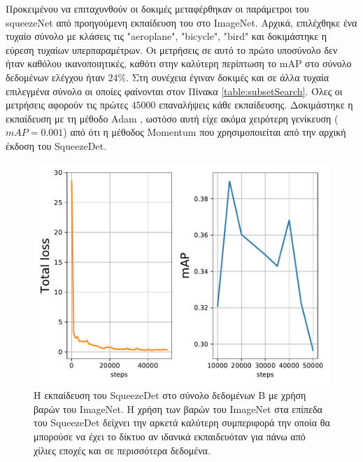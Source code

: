Προκειμένου να επιταχυνθούν οι δοκιμές μεταφέρθηκαν οι παράμετροι του squeezeNet από προηγούμενη εκπαίδευση του στο ImageNet. Αρχικά, επιλέχθηκε ένα τυχαίο σύνολο με κλάσεις τις "aeroplane", "bicycle", "bird" και δοκιμάστηκε η εύρεση τυχαίων υπερπαραμέτρων. Οι μετρήσεις σε αυτό το πρώτο υποσύνολο δεν ήταν καθόλου ικανοποιητικές, καθότι στην καλύτερη περίπτωση το mAP στο σύνολο δεδομένων ελέγχου ήταν $24\%$. Στη συνέχεια έγιναν δοκιμές και σε άλλα τυχαία επιλεγμένα σύνολο οι οποίες φαίνονται στον Πίνακα \ref{table:subsetSearch}. Όλες οι μετρήσεις αφορούν τις πρώτες $45000$ επαναλήψεις κάθε εκπαίδευσης. Δοκιμάστηκε η εκπαίδευση με τη μέθοδο Adam \cite{19}, ωστόσο αυτή είχε ακόμα χειρότερη γενίκευση ($mAP=0.001$) από ότι η μέθοδος Momentum \cite{81} που χρησιμοποιείται από την αρχική έκδοση του SqueezeDet.

\begin{figure}
\centering
\includegraphics[width = \textwidth]{figures/experiments/Btrain1.pdf}
\caption[Η εκπαίδευση του SqueezeDet στο σύνολο δεδομένων B, με χρήση βαρών του ImageNet]{Η εκπαίδευση του SqueezeDet στο σύνολο δεδομένων B με χρήση βαρών του ImageNet. Η χρήση των βαρών του ImageNet στα επίπεδα του SqueezeDet δείχνει την αρκετά καλύτερη συμπεριφορά την οποία θα μπορούσε να έχει το δίκτυο αν ιδανικά εκπαιδευόταν για πάνω από χίλιες εποχές και σε περισσότερα δεδομένα.}
\label{fig:Btrain1}
\end{figure}

